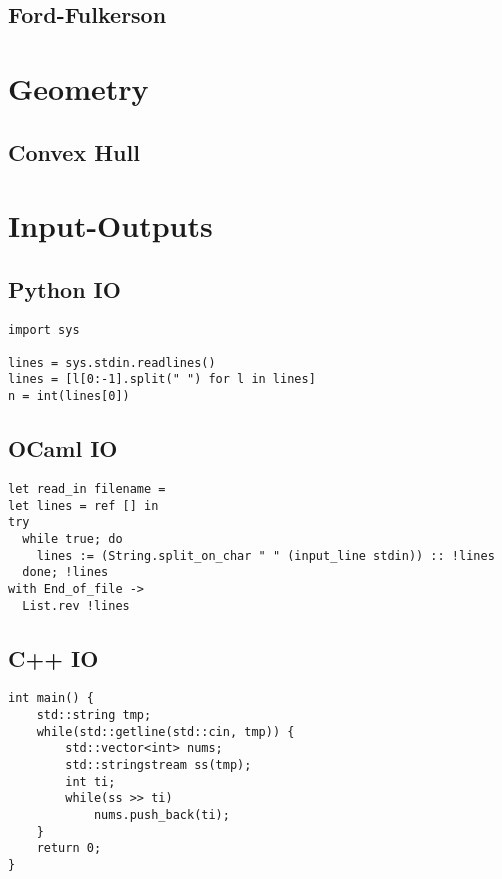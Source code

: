 \documentclass[10pt,a4paper]{article}
\begin{document}
\begin{landscape}
\begin{multicols}{2}


\subsection{Ford-Fulkerson}



\section{Geometry}

\subsection{Convex Hull}



\section{Input-Outputs}

\subsection{Python IO}

\lstset{style=py}

\begin{lstlisting}
import sys

lines = sys.stdin.readlines()
lines = [l[0:-1].split(" ") for l in lines]
n = int(lines[0])
\end{lstlisting}

\subsection{OCaml IO}

\lstset{style=ocaml}

\begin{lstlisting}
let read_in filename = 
let lines = ref [] in
try
  while true; do
    lines := (String.split_on_char " " (input_line stdin)) :: !lines
  done; !lines
with End_of_file ->
  List.rev !lines
\end{lstlisting}

\subsection{C++ IO}

\begin{lstlisting}
int main() {
    std::string tmp;
    while(std::getline(std::cin, tmp)) {
        std::vector<int> nums;
        std::stringstream ss(tmp);
        int ti;
        while(ss >> ti) 
            nums.push_back(ti);
    }
    return 0;
}
\end{lstlisting}

\lstset{style=cpp}

\end{multicols}
\end{landscape}
\end{document}
